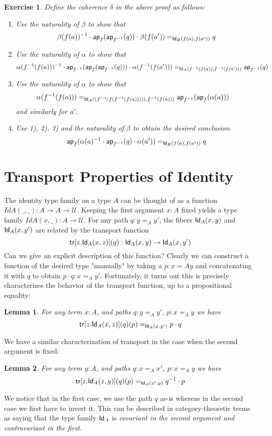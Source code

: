 \documentclass[12pt]{article}
\newcommand{\ap}{\mathsf{ap}}
\newcommand{\tr}{\mathsf{tr}}
\newcommand*{\U}{\mathcal{U}}
\newtheorem*{exercise}{Exercise}
\newtheorem*{lemma}{Lemma}
\begin{document}
\begin{exercise}
Define the coherence $\delta$ in the above proof as follows:
\begin{enumerate}
\item Use the naturality of $\beta$ to show that
$$\beta(f(a))^{-1} \cdot \ap_f(\ap_{f^{-1}}(q)) \cdot \beta(f(a')) =_{\Id{B}(f(a),f(a'))} q$$
\item Use the naturality of $\alpha$ to show that
$$\alpha(f^{-1}(f(a)))^{-1} \cdot \ap_{f^{-1}}(\ap_f(\ap_{f^{-1}}(q))) \cdot \alpha(f^{-1}(f(a'))) =_{\Id{A}(f^{-1}(f(a)),f^{-1}(f(a')))} \ap_{f^{-1}}(q)$$
\item Use the naturality of $\alpha$ to show that
\begin{align*}
& \alpha(f^{-1}(f(a))) =_{\Id{A}((f^{-1}(f(f^{-1}(f(a))))), f^{-1}(f(a)))}  \ap_{f^{-1}}(\ap_f(\alpha(a)))
\end{align*}
and similarly for $a'$.
\item Use 1), 2), 3) and the naturality of $\beta$ to obtain the desired conclusion
$$\ap_f(\alpha(a)^{-1} \cdot \ap_{f^{-1}}(q) \cdot \alpha(a')) =_{\Id{B}(f(a),f(a'))} q$$
\end{enumerate}
\end{exercise}

\section{Transport Properties of Identity}\label{}

The identity type family on a type $A$ can be thought of as a function $Id{A}(\_,\_) : A \to A \to \mathcal{U}$. Keeping the first argument $x : A$ fixed yields a type family
$Id{A}(x,\_) : A \to \U$. For any path $q : y =_A y'$, the fibers $\mathsf{Id}_{A}(x,y)$ and $\mathsf{Id}_{A}(x, y')$ are related by the transport function
\[ \tr[z.\Id{A}(x, z)](q) : \Id{A}(x, y) \to \Id{A}(x, y') \]
Can we give an explicit description of this function? Clearly we can construct a function of the desired type "manually" by taking a $p : x =A y$ and concatenating it
with $q$ to obtain $p \cdot q : x =_A y'$. Fortunately, it turns out this is precisely characterizes the behavior of the transport function, up to a propositional equality:
\begin{lemma}
For any term $x : A$, and paths $q : y =_A y'$, $p : x =_A y$ we have
\[ \tr[z.\Id{A}(x, z)](q)(p) =_{\Id{A}(x,y')} p \cdot q \]
\end{lemma}
We have a similar characterization of transport in the case when the second
argument is fixed:
\begin{lemma}
For any term $y : A$, and paths $q : x =_A x'$, $p : x =_A y$ we have
\[ \tr[z.\Id{A}(z, y)](q)(p) =_{\Id{A}(x',y)} q^{- 1} \cdot p \]
\end{lemma}
We notice that in the first case, we use the path $q$ as-is whereas in the second
case we first have to invert it. This can be described in category-theoretic terms as
saying that the type family $\mathsf{Id}_{A}$ is \emph{covariant in the second argument and contravariant
in the first.}
\end{document}
